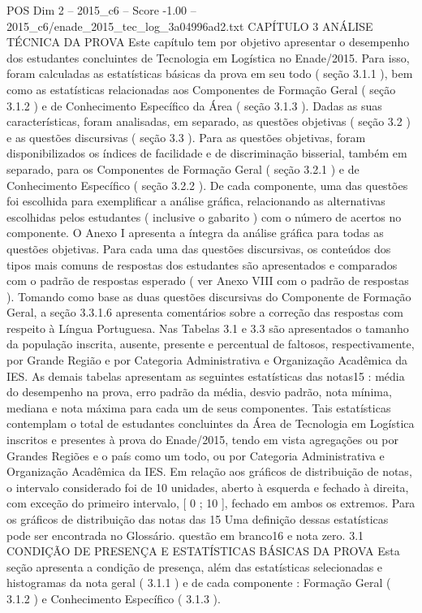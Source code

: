 \begin{textsample}{POS Dim 2 – 2015\_c6 – Score -1.00 – 2015\_c6/enade\_2015\_tec\_log\_3a04996ad2.txt}  \label{ex:f2_pos_243}
CAPÍTULO 3 ANÁLISE TÉCNICA DA PROVA Este capítulo tem por objetivo apresentar o desempenho dos estudantes concluintes de Tecnologia em Logística no Enade/2015.
Para isso, foram calculadas as estatísticas básicas da prova em seu todo ( seção 3.1.1 ), bem como as estatísticas relacionadas aos Componentes de Formação Geral ( seção 3.1.2 ) e de Conhecimento Específico da Área ( seção 3.1.3 ).
Dadas as suas características, foram analisadas, em separado, as questões objetivas ( seção 3.2 ) e as questões discursivas ( seção 3.3 ).
Para as questões objetivas, foram disponibilizados os índices de facilidade e de discriminação bisserial, também em separado, para os Componentes de Formação Geral ( seção 3.2.1 ) e de Conhecimento Específico ( seção 3.2.2 ).
De cada componente, uma das questões foi escolhida para exemplificar a análise gráfica, relacionando as alternativas escolhidas pelos estudantes ( inclusive o gabarito ) com o número de acertos no componente.
O Anexo I apresenta a íntegra da análise gráfica para todas as questões objetivas.
Para cada uma das questões discursivas, os conteúdos dos tipos mais comuns de respostas dos estudantes são apresentados e comparados com o padrão de respostas esperado ( ver Anexo VIII com o padrão de respostas ).
Tomando como base as duas questões discursivas do Componente de Formação Geral, a seção 3.3.1.6 apresenta comentários sobre a correção das respostas com respeito à Língua Portuguesa.
Nas Tabelas 3.1 e 3.3 são apresentados o tamanho da população inscrita, ausente, presente e percentual de faltosos, respectivamente, por Grande Região e por Categoria Administrativa e Organização Acadêmica da IES.
As demais tabelas apresentam as seguintes estatísticas das notas15 : média do desempenho na prova, erro padrão da média, desvio padrão, nota mínima, mediana e nota máxima para cada um de seus componentes.
Tais estatísticas contemplam o total de estudantes concluintes da Área de Tecnologia em Logística inscritos e presentes à prova do Enade/2015, tendo em vista agregações ou por Grandes Regiões e o país como um todo, ou por Categoria Administrativa e Organização Acadêmica da IES.
Em relação aos gráficos de distribuição de notas, o intervalo considerado foi de 10 unidades, aberto à esquerda e fechado à direita, com exceção do primeiro intervalo, [ 0 ; 10 ], fechado em ambos os extremos.
Para os gráficos de distribuição das notas das 15 Uma definição dessas estatísticas pode ser encontrada no Glossário. questão em branco16 e nota zero. 3.1 CONDIÇÃO DE PRESENÇA E ESTATÍSTICAS BÁSICAS DA PROVA Esta seção apresenta a condição de presença, além das estatísticas selecionadas e histogramas da nota geral ( 3.1.1 ) e de cada componente : Formação Geral ( 3.1.2 ) e Conhecimento Específico ( 3.1.3 ).

\end{textsample}
